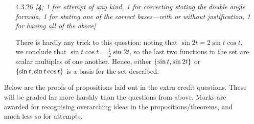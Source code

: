 \documentclass{amsart}
\theoremstyle{definition}
\theoremstyle{definition}
\DeclareMathOperator{\1}{\mathbbm{1}}
\begin{document}
\begin{enumerate}[itemsep = 2mm]
		

		
		\item[4.3.26] \textit{[\textbf{4}; 1 for attempt of any kind, 1 for correcting stating the double angle formula, 1 for stating one of the correct bases---with or without justification, 1 for having all of the above]}
		
		There is hardly any trick to this question: noting that $\sin 2t = 2 \sin t \cos t$, we conclude that $\sin t \cos t = \frac{1}{2} \sin 2t$, so the last two functions in the set are scalar multiples of one another. Hence, either $\set{\sin t, \sin 2t}$ or $\set{\sin t, \sin t \cos t}$ is a basis for the set described.
		
		
	\end{enumerate}
		
		\bigskip %
		
		Below are the proofs of propositions laid out in the extra credit questions. These will be graded far more harshly than the questions from above. Marks are awarded for recognising overarching ideas in the propositions/theorems, and much less so for attempts.
		
\end{document}

